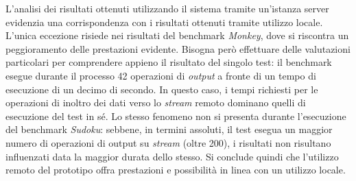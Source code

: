 L'analisi dei risultati ottenuti utilizzando il sistema tramite un'istanza server evidenzia una corrispondenza con i risultati ottenuti tramite utilizzo locale. L'unica eccezione risiede nei risultati del benchmark \emph{Monkey}, dove si riscontra un peggioramento delle prestazioni evidente. Bisogna però effettuare delle valutazioni particolari per comprendere appieno il risultato del singolo test: il benchmark esegue durante il processo 42 operazioni di \emph{output} a fronte di un tempo di esecuzione di un decimo di secondo. In questo caso, i tempi richiesti per le operazioni di inoltro dei dati verso lo \emph{stream} remoto dominano quelli di esecuzione del test in sé. Lo stesso fenomeno non si presenta durante l'esecuzione del benchmark \emph{Sudoku}: sebbene, in termini assoluti, il test esegua un maggior numero di operazioni di output su \emph{stream} (oltre 200), i risultati non risultano influenzati data la maggior durata dello stesso. Si conclude quindi che l'utilizzo remoto del prototipo offra prestazioni e possibilità in linea con un utilizzo locale.





